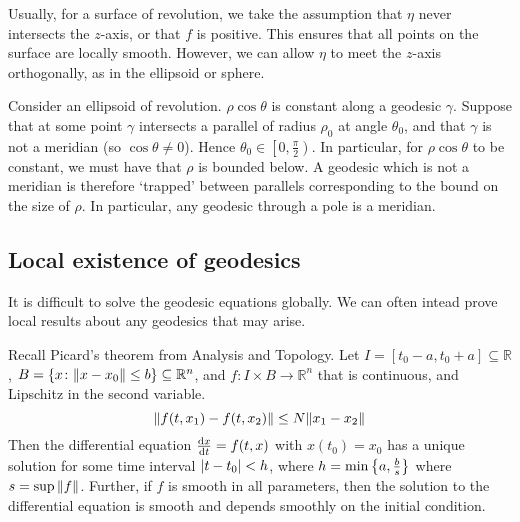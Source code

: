 \begin{example}
	Usually, for a surface of revolution, we take the assumption that \( \eta \) never intersects the \( z \)-axis, or that \( f \) is positive.
	This ensures that all points on the surface are locally smooth.
	However, we can allow \( \eta \) to meet the \( z \)-axis orthogonally, as in the ellipsoid or sphere.

	Consider an ellipsoid of revolution.
	\( \rho \cos \theta \) is constant along a geodesic \( \gamma \).
	Suppose that at some point \( \gamma \) intersects a parallel of radius \( \rho_0 \) at angle \( \theta_0 \), and that \( \gamma \) is not a meridian (so \( \cos \theta \neq 0 \)).
	Hence \( \theta_0 \in \left[0, \frac{\pi}{2}\right) \).
	In particular, for \( \rho \cos \theta \) to be constant, we must have that \( \rho \) is bounded below.
	A geodesic which is not a meridian is therefore `trapped' between parallels corresponding to the bound on the size of \( \rho \).
	In particular, any geodesic through a pole is a meridian.
\end{example}

\subsection{Local existence of geodesics}
It is difficult to solve the geodesic equations globally.
We can often intead prove local results about any geodesics that may arise.

Recall Picard's theorem from Analysis and Topology.
Let \( I = [t_0 - a, t_0 + a] \subseteq \mathbb R \), \( B = \qty{x \colon \norm{x-x_0} \leq b} \subseteq \mathbb R^n \), and \( f \colon I \times B \to \mathbb R^n \) that is continuous, and Lipschitz in the second variable.
\[ \norm{f(t,x_1) - f(t,x_2)} \leq N \norm{x_1-x_2} \]
Then the differential equation \( \dv{x}{t} = f(t,x) \) with \( x(t_0) = x_0 \) has a unique solution for some time interval \( \abs{t-t_0} < h \), where \( h = \min\qty{a,\frac{b}{s}} \) where \( s = \sup \norm{f} \).
Further, if \( f \) is smooth in all parameters, then the solution to the differential equation is smooth and depends smoothly on the initial condition.

